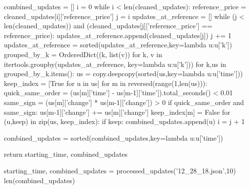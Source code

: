     combined_updates = []
    i = 0
    while i < len(cleaned_updates):
        reference_price = cleaned_updates[i]['reference_price']
        j = i
        updates_at_reference = []
        while (j < len(cleaned_updates)) and (cleaned_updates[j]['reference_price'] == reference_price):
            updates_at_reference.append(cleaned_updates[j])
            j += 1
        updates_at_reference = sorted(updates_at_reference,key=lambda u:u['k'])
        grouped_by_k = OrderedDict((k, list(v)) for k, v in itertools.groupby(updates_at_reference, key=lambda u:u['k']))
        for k,us in grouped_by_k.items():
            us = copy.deepcopy(sorted(us,key=lambda u:u['time']))
            keep_index = [True for u in us]
            for m in reversed(range(1,len(us))):
                quick_same_order = (us[m]['time'] - us[m-1]['time']).total_seconds() < 0.01
                same_sign = (us[m]['change'] * us[m-1]['change']) > 0
                if quick_same_order and same_sign:
                    us[m-1]['change'] += us[m]['change']
                    keep_index[m] = False
            for (u,keep) in zip(us, keep_index):
                if keep:
                    combined_updates.append(u)
        i = j + 1

    combined_updates = sorted(combined_updates,key=lambda u:u['time'])
    
    return starting_time, combined_updates

starting_time, combined_updates = processed_updates('12_28_18.json',10)
len(combined_updates)